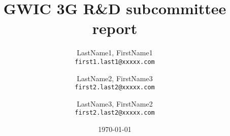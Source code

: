 \documentclass[url,11pt]{article}
\def\biblio{}
\begin{document}
\dosecttoc

\def\biblio{} %
\togglefalse{standalone}


\title{GWIC 3G R\&D subcommittee report }

\author{
  LastName1, FirstName1\\
  \texttt{first1.last1@xxxxx.com}
  \and
  LastName2, FirstName3\\
  \texttt{first2.last2@xxxxx.com}
  \and
  LastName3, FirstName2\\
  \texttt{first2.last2@xxxxx.com}
}

\date{\today}
\maketitle
\tableofcontents
\pagebreak



\newpage


\newpage


\newpage


\newpage


\newpage

\newpage

\newpage

\newpage

\newpage


\newpage

\newpage

\newpage

\newpage

\newpage
\newpage
{}



\newpage
{}
\appendix


%
%
\end{document}
